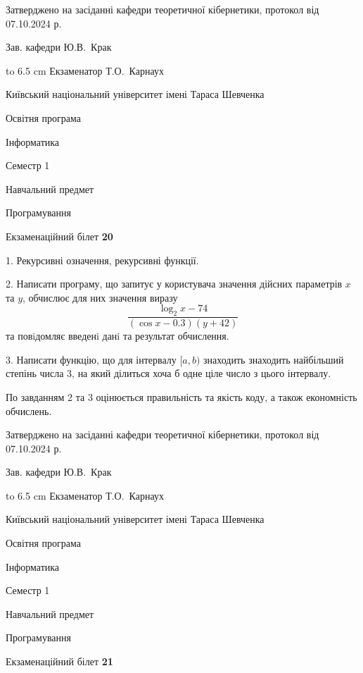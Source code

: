 \documentclass[12pt, ukrainian]{article}
\begin{document}
{\smallskip\smallskip \begin {scriptsize} Затверджено на засіданні кафедри теоретичної кібернетики, протокол   від   07.10.2024 р.\par\smallskip\smallskip\smallskip\smallskip
{\parbox {6.5 cm} {Зав. кафедри \dotfill Ю.В.~Крак}}\hspace {0.7cm} {\hbox to 6.5 cm { Екзаменатор \dotfill Т.О.~Карнаух}} \end{scriptsize}}
\vspace{0.9cm}
{{\begin {scriptsize}\par
{ \center  Київський національний університет імені Тараса Шевченка \par}
{\parbox {5 cm}{Освітня програма \hfill}{\parbox {7 cm}{Інформатика\hfill}}\parbox {6 cm}{\hfill Семестр 1}}\par
{\parbox {5 cm} {Навчальний предмет \hfill}\parbox {7 cm}{Програмування \hfill}\parbox {6cm}{\hfill}\par}\vspace{-15pt} \end{scriptsize}}{\center Екзаменаційний білет \No \textbf { 20 }\par}}
{%
1. Рекурсивні означення, рекурсивні функції.%
\par
2. Написати програму, що запитує у користувача значення дійсних параметрів $x$ та $y$, обчислює для них значення виразу 
$$\frac{\log_{2} x - 74}{(\cos x - 0.3) (y + 42)}$$ 
та повiдомляє введенi данi та результат обчислення.

\par
3. Написати функцію, що для інтервалу $[a, b)$ знаходить знаходить найбільший степінь числа 3, на який ділиться хоча б одне ціле число з цього інтервалу.

По завданням 2 та 3 оцінюється правильність та якість коду, а також економність обчислень.

}
{\smallskip\smallskip \begin {scriptsize} Затверджено на засіданні кафедри теоретичної кібернетики, протокол   від   07.10.2024 р.\par\smallskip\smallskip\smallskip\smallskip
{\parbox {6.5 cm} {Зав. кафедри \dotfill Ю.В.~Крак}}\hspace {0.7cm} {\hbox to 6.5 cm { Екзаменатор \dotfill Т.О.~Карнаух}} \end{scriptsize}}
\vspace{0.9cm}
{{\begin {scriptsize}\par
{ \center  Київський національний університет імені Тараса Шевченка \par}
{\parbox {5 cm}{Освітня програма \hfill}{\parbox {7 cm}{Інформатика\hfill}}\parbox {6 cm}{\hfill Семестр 1}}\par
{\parbox {5 cm} {Навчальний предмет \hfill}\parbox {7 cm}{Програмування \hfill}\parbox {6cm}{\hfill}\par}\vspace{-15pt} \end{scriptsize}}{\center Екзаменаційний білет \No \textbf { 21 }\par}}
\end{document}
